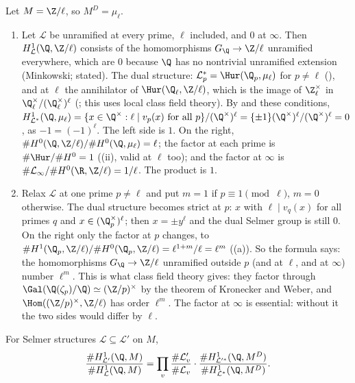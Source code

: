 \begin{example}\label{ex:galcoh:gw-check}
Let $M=\Z/\ell$, so $M^D=\mu_\ell$.
\begin{enumerate}[label=(\alph*)]
\item Let $\mathcal L$ be unramified at every prime, $\ell$ included, and $0$ at $\infty$. Then $H^1_{\mathcal L}(\Q,\Z/\ell)$ consists of the homomorphisms $G_\Q\to\Z/\ell$ unramified
everywhere, which are $0$ because $\Q$ has no nontrivial unramified extension (Minkowski; stated). The dual structure: $\mathcal L^*_p=\Hur(\Q_p,\mu_\ell)$ for $p\ne\ell$
(), and at $\ell$ the annihilator of $\Hur(\Q_\ell,\Z/\ell)$, which is the image of $\Z_\ell^\times$ in $\Q_\ell^\times/(\Q_\ell^\times)^\ell$
(; this uses local class field theory). By  and these conditions,
$H^1_{\mathcal L^*}(\Q,\mu_\ell)=\{x\in\Q^\times:\ell\mid v_p(x)\text{ for all }p\}/(\Q^\times)^\ell=\{\pm1\}(\Q^\times)^\ell/(\Q^\times)^\ell=0$, as $-1=(-1)^\ell$. The left side is $1$. On
the right, $\#H^0(\Q,\Z/\ell)/\#H^0(\Q,\mu_\ell)=\ell$; the factor at each prime is $\#\Hur/\#H^0=1$ ((ii), valid at $\ell$ too); and the
factor at $\infty$ is $\#\mathcal L_\infty/\#H^0(\R,\Z/\ell)=1/\ell$. The product is $1$.
\item Relax $\mathcal L$ at one prime $p\ne\ell$ and put $m=1$ if $p\equiv1\pmod\ell$, $m=0$ otherwise. The dual structure becomes strict at $p$: $x$ with $\ell\mid v_q(x)$
for all primes $q$ and $x\in(\Q_p^\times)^\ell$; then $x=\pm y^\ell$ and the dual Selmer group is still $0$. On the right only the factor at $p$ changes, to
$\#H^1(\Q_p,\Z/\ell)/\#H^0(\Q_p,\Z/\ell)=\ell^{1+m}/\ell=\ell^m$ ((a)). So the formula says: the homomorphisms $G_\Q\to\Z/\ell$ unramified outside
$p$ (and at $\ell$, and at $\infty$) number $\ell^m$. This is what class field theory gives: they factor through $\Gal(\Q(\zeta_p)/\Q)\simeq(\Z/p)^\times$ by the theorem
of Kronecker and Weber, and $\Hom((\Z/p)^\times,\Z/\ell)$ has order $\ell^m$. The factor at $\infty$ is essential: without it the two sides would differ by $\ell$.
\end{enumerate}
\end{example}

\begin{corollary}\label{cor:galcoh:gw-comparison}
For Selmer structures $\mathcal L\subseteq\mathcal L'$ on $M$,
\[
\frac{\#H^1_{\mathcal L'}(\Q,M)}{\#H^1_{\mathcal L}(\Q,M)}=\prod_v\frac{\#\mathcal L'_v}{\#\mathcal L_v}\cdot\frac{\#H^1_{\mathcal L'^*}(\Q,M^D)}{\#H^1_{\mathcal L^*}(\Q,M^D)} .
\]
\end{corollary}

